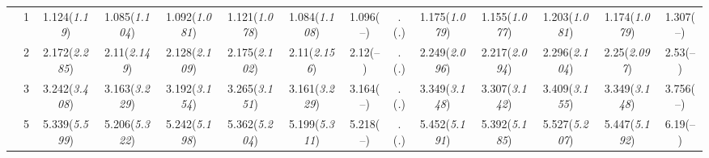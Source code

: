 \documentclass{article}
\begin{document}
\begin{table}[tbp]
{\begin{tabularx}{\textwidth}{lCCCCCCCCCCCCC}
&1&1.124\newline (\emph{1.19})&1.085\newline (\emph{1.104})&1.092\newline (\emph{1.081})&1.121\newline (\emph{1.078})&1.084\newline (\emph{1.108})&1.096\newline (--)&.\newline (\emph{.})&1.175\newline (\emph{1.079})&1.155\newline (\emph{1.077})&1.203\newline (\emph{1.081})&1.174\newline (\emph{1.079})&1.307\newline (--) \tabularnewline
&2&2.172\newline (\emph{2.285})&2.11\newline (\emph{2.149})&2.128\newline (\emph{2.109})&2.175\newline (\emph{2.102})&2.11\newline (\emph{2.156})&2.12\newline (--)&.\newline (\emph{.})&2.249\newline (\emph{2.096})&2.217\newline (\emph{2.094})&2.296\newline (\emph{2.104})&2.25\newline (\emph{2.097})&2.53\newline (--) \tabularnewline
&3&3.242\newline (\emph{3.408})&3.163\newline (\emph{3.229})&3.192\newline (\emph{3.154})&3.265\newline (\emph{3.151})&3.161\newline (\emph{3.229})&3.164\newline (--)&.\newline (\emph{.})&3.349\newline (\emph{3.148})&3.307\newline (\emph{3.142})&3.409\newline (\emph{3.155})&3.349\newline (\emph{3.148})&3.756\newline (--) \tabularnewline
&5&5.339\newline (\emph{5.599})&5.206\newline (\emph{5.322})&5.242\newline (\emph{5.198})&5.362\newline (\emph{5.204})&5.199\newline (\emph{5.311})&5.218\newline (--)&.\newline (\emph{.})&5.452\newline (\emph{5.191})&5.392\newline (\emph{5.185})&5.527\newline (\emph{5.207})&5.447\newline (\emph{5.192})&6.19\newline (--) \tabularnewline

\end{tabularx}}
\end{table}
\end{document}
